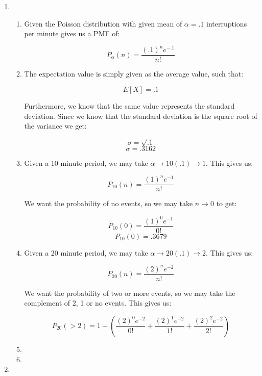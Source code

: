 \begin{enumerate}

  \item 

    \begin{enumerate}

      \item Given the Poisson distribution with given mean of $\alpha=.1$ interruptions per minute gives us a PMF of:

        $$\boxed{P_{\alpha}(n)=\frac{(.1)^ne^{-.1}}{n!}}$$

      \item The expectation value is simply given as the average value, such that:

        $$\boxed{E[X]=.1}$$

        Furthermore, we know that the same value represents the standard deviation. Since we know that the standard deviation is the square root of the variance we get:

        $$\sigma=\sqrt{.1}$$
        $$\boxed{\sigma=.3162}$$

      \item Given a 10 minute period, we may take $\alpha\to 10(.1)\to 1$. This gives us:

        $$P_{10}(n)=\frac{(1)^ne^{-1}}{n!}$$

        We want the probability of no events, so we may take $n\to 0$ to get:

        $$P_{10}(0)=\frac{(1)^0e^{-1}}{0!}$$
        $$\boxed{P_{10}(0)=.3679}$$

      \item Given a 20 minute period, we may take $\alpha\to 20(.1)\to 2$. This gives us:

        $$P_{20}(n)=\frac{(2)^ne^{-2}}{n!}$$

        We want the probability of two or more events, so we may take the complement of 2, 1 or no events. This gives us:

        $$P_{20}(>2)=1-\left(\frac{(2)^0e^{-2}}{0!}+\frac{(2)^1e^{-2}}{1!}+\frac{(2)^2e^{-2}}{2!}\right)$$

      \item 

      \item 

    \end{enumerate}

  \item 

    \begin{enumerate}


\end{enumerate}
\end{enumerate}
